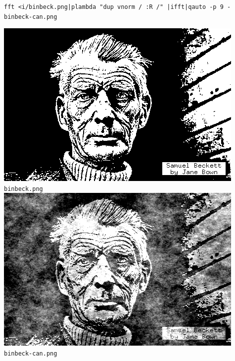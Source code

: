 \begin{verbatim}
fft <i/binbeck.png|plambda "dup vnorm / :R /" |ifft|qauto -p 9 - binbeck-can.png
\end{verbatim}
\includegraphics{i/binbeck.png}{\small\tt binbeck.png}\\
\includegraphics{binbeck-can.png}{\small\tt binbeck-can.png}



